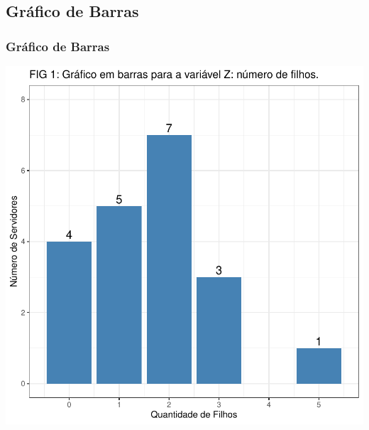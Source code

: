 \documentclass[14pt,aspectratio=1610]{beamer}
\begin{document}
\subsection{Gráfico de Barras}
\begin{frame}{}
\frametitle{Gráfico de Barras}
\vspace{-0.5cm}
\begin{block}{}
\begin{center}
\includegraphics{Aula5-bar1}
\end{center}
\end{block}
\end{frame}
\end{document}
